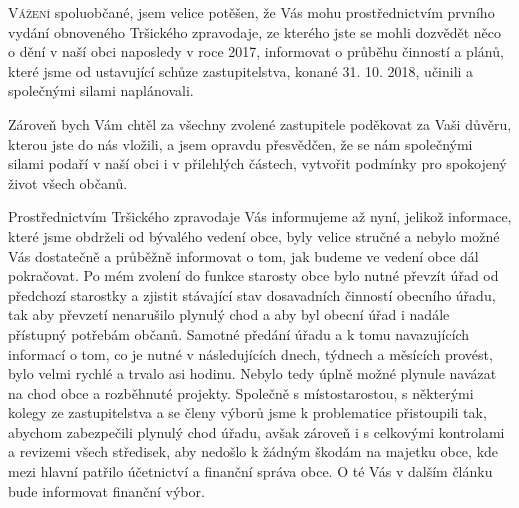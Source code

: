 \documentclass[11pt]{article}
\begin{document}
\begin{multicols}{3}{

\lettrine{V}{ážení} spoluobčané, jsem velice potěšen, že Vás mohu prostřednictvím prvního vydání obnoveného Tršického zpravodaje, ze kterého jste se mohli dozvědět něco o dění v naší obci naposledy v roce 2017, informovat o průběhu činností a plánů, které jsme od ustavující schůze zastupitelstva, konané 31. 10. 2018, učinili a společnými silami naplánovali.

Zároveň bych Vám chtěl za všechny zvolené zastupitele poděkovat za Vaši důvěru, kterou jste do nás vložili, a jsem opravdu přesvědčen, že se nám společnými silami podaří v naší obci i v přilehlých částech, vytvořit podmínky pro spokojený život všech občanů.

Prostřednictvím Tršického zpravodaje Vás informujeme až nyní, jelikož informace, které jsme obdrželi od bývalého vedení obce, byly velice stručné a nebylo možné Vás dostatečně a průběžně informovat o tom, jak budeme ve vedení obce dál pokračovat. Po mém zvolení do funkce starosty obce bylo nutné převzít úřad od předchozí starostky a zjistit stávající stav dosavadních činností obecního úřadu, tak aby převzetí nenarušilo plynulý chod a aby byl obecní úřad i nadále přístupný potřebám občanů. Samotné předání úřadu a k tomu navazujících informací o tom, co je nutné v následujících dnech, týdnech a měsících provést, bylo velmi rychlé a trvalo asi hodinu. Nebylo tedy úplně možné plynule navázat na chod obce a rozběhnuté projekty. Společně s místostarostou, s některými kolegy ze zastupitelstva a se členy výborů jsme k problematice přistoupili tak, abychom zabezpečili plynulý chod úřadu, avšak zároveň i s celkovými kontrolami a revizemi všech středisek, aby nedošlo k žádným škodám na majetku obce, kde mezi hlavní patřilo účetnictví a finanční správa obce. O té Vás v dalším článku bude informovat finanční výbor.

}
\end{multicols}
\end{document}
